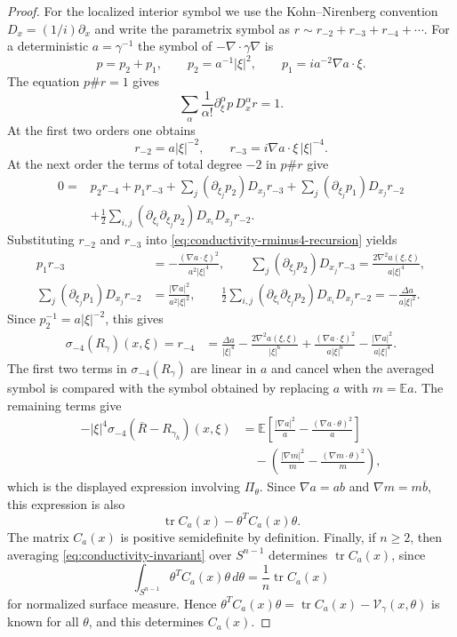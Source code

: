 \documentclass[10pt,a4paper]{amsart}
\newcommand{\E}{\mathbb E}
\newcommand{\tr}{\operatorname{tr}}
\begin{document}
\begin{proof}
For the localized interior symbol we use the Kohn--Nirenberg convention
$D_x=(1/i)\partial_x$ and write the parametrix symbol as
$r\sim r_{-2}+r_{-3}+r_{-4}+\cdots$.  For a deterministic
$a=\gamma^{-1}$ the symbol of $-\nabla\cdot\gamma\nabla$ is
\[
  p=p_2+p_1,
  \qquad
  p_2=a^{-1}|\xi|^2,
  \qquad
  p_1=ia^{-2}\nabla a\cdot\xi .
\]
The equation $p\# r=1$ gives
\[
  \sum_\alpha\frac1{\alpha!}\partial_\xi^\alpha p\,D_x^\alpha r=1.
\]
At the first two orders one obtains
\[
  r_{-2}=a|\xi|^{-2},
  \qquad
  r_{-3}=i\nabla a\cdot\xi\,|\xi|^{-4}.
\]
At the next order the terms of total degree $-2$ in $p\# r$ give
\begin{equation}\label{eq:conductivity-rminus4-recursion}
\begin{split}
0={}&p_2r_{-4}+p_1r_{-3}
 +\sum_j(\partial_{\xi_j}p_2)D_{x_j}r_{-3}
 +\sum_j(\partial_{\xi_j}p_1)D_{x_j}r_{-2}  \\
&+\frac12\sum_{i,j}(\partial_{\xi_i}\partial_{\xi_j}p_2)
  D_{x_i}D_{x_j}r_{-2}.
\end{split}
\end{equation}
Substituting $r_{-2}$ and $r_{-3}$ into \eqref{eq:conductivity-rminus4-recursion} yields
\[
\begin{split}
 p_1r_{-3}&=-\frac{(\nabla a\cdot\xi)^2}{a^2|\xi|^4},\qquad
 \sum_j(\partial_{\xi_j}p_2)D_{x_j}r_{-3}
 =\frac{2\nabla^2a(\xi,\xi)}{a|\xi|^4},\\
 \sum_j(\partial_{\xi_j}p_1)D_{x_j}r_{-2}
 &=\frac{|\nabla a|^2}{a^2|\xi|^2},\qquad
 \frac12\sum_{i,j}(\partial_{\xi_i}\partial_{\xi_j}p_2)
  D_{x_i}D_{x_j}r_{-2}
 =-\frac{\Delta a}{a|\xi|^2}.
\end{split}
\]
Since $p_2^{-1}=a|\xi|^{-2}$, this gives
\begin{align*}
 \sigma_{-4}(R_\gamma)(x,\xi)=r_{-4}
 &=\frac{\Delta a}{|\xi|^4}
 -\frac{2\nabla^2a(\xi,\xi)}{|\xi|^6}
 +\frac{(\nabla a\cdot\xi)^2}{a|\xi|^6}
 -\frac{|\nabla a|^2}{a|\xi|^4}.
\end{align*}
The first two terms in $\sigma_{-4}(R_\gamma)$ are linear in $a$ and cancel when the averaged symbol is compared with the symbol obtained by replacing $a$ with $m=\E a$.  The remaining terms give
\[
\begin{split}
- |\xi|^4\sigma_{-4}(\overline R-R_{\gamma_h})(x,\xi)
&=\E\left[\frac{|\nabla a|^2}{a}
     -\frac{(\nabla a\cdot\theta)^2}{a}\right] \\
&\quad -\left(\frac{|\nabla m|^2}{m}
     -\frac{(\nabla m\cdot\theta)^2}{m}\right),
\end{split}
\]
which is the displayed expression involving $\Pi_\theta$.  Since $\nabla a=ab$ and $\nabla m=m\overline b$, this expression is also
\[
  \tr C_a(x)-\theta^TC_a(x)\theta.
\]
The matrix $C_a(x)$ is positive semidefinite by definition.  Finally, if $n\ge2$, then averaging \eqref{eq:conductivity-invariant} over $S^{n-1}$ determines $\tr C_a(x)$, since
\[
  \int_{S^{n-1}}\theta^TC_a(x)\theta\,d\theta
  =\frac1n\tr C_a(x)
\]
for normalized surface measure.  Hence $\theta^TC_a(x)\theta=\tr C_a(x)-\mathcal V_\gamma(x,\theta)$ is known for all $\theta$, and this determines $C_a(x)$.
\end{proof}
\end{document}
